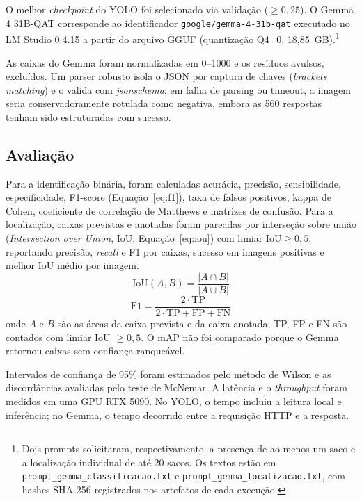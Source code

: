 \documentclass[kdmile,a4paper]{kdmile}
\begin{document}
O melhor \emph{checkpoint} do YOLO foi selecionado via validação ($\ge 0{,}25$). O Gemma 4 31B-QAT corresponde ao identificador \texttt{google/gemma-4-31b-qat} executado no LM Studio 0.4.15 a partir do arquivo GGUF  (quantização Q4\_0, 18,85~GB).\footnote{Dois prompts solicitaram, respectivamente, a presença de ao menos um saco e a localização individual de até 20 sacos. Os textos estão em \texttt{prompt\_gemma\_classificacao.txt} e \texttt{prompt\_gemma\_localizacao.txt}, com hashes SHA-256 registrados nos artefatos de cada execução.}

As caixas do Gemma foram normalizadas em 0--1000 e os resíduos avulsos, excluídos. Um parser robusto isola o JSON por captura de chaves (\emph{brackets matching}) e o valida com \emph{jsonschema}; em falha de parsing ou timeout, a imagem seria conservadoramente rotulada como negativa, embora as 560 respostas tenham sido estruturadas com sucesso.

\subsection{Avaliação}
\label{sec:avaliacao}

Para a identificação binária, foram calculadas acurácia, precisão, sensibilidade, especificidade, F1-score (Equação~\ref{eq:f1}), taxa de falsos positivos, kappa de Cohen, coeficiente de correlação de Matthews e matrizes de confusão. Para a localização, caixas previstas e anotadas foram pareadas por interseção sobre união (\emph{Intersection over Union}, IoU, Equação~\ref{eq:iou}) com limiar $\mathrm{IoU} \ge 0{,}5$, reportando precisão, \emph{recall} e F1 por caixas, sucesso em imagens positivas e melhor IoU médio por imagem.
\begin{equation}
\mathrm{IoU}(A,B) = \frac{|A \cap B|}{|A \cup B|}
\label{eq:iou}
\end{equation}
\begin{equation}
\mathrm{F1} = \frac{2 \cdot \mathrm{TP}}{2 \cdot \mathrm{TP} + \mathrm{FP} + \mathrm{FN}}
\label{eq:f1}
\end{equation}
\noindent onde $A$ e $B$ são as áreas da caixa prevista e da caixa anotada; TP, FP e FN são contados com limiar IoU $\ge 0{,}5$. O mAP não foi comparado porque o Gemma retornou caixas sem confiança ranqueável.

Intervalos de confiança de 95\% foram estimados pelo método de Wilson e as discordâncias avaliadas pelo teste de McNemar. A latência e o \emph{throughput} foram medidos em uma GPU RTX 5090. No YOLO, o tempo incluiu a leitura local e inferência; no Gemma, o tempo decorrido entre a requisição HTTP e a resposta.
\end{document}
